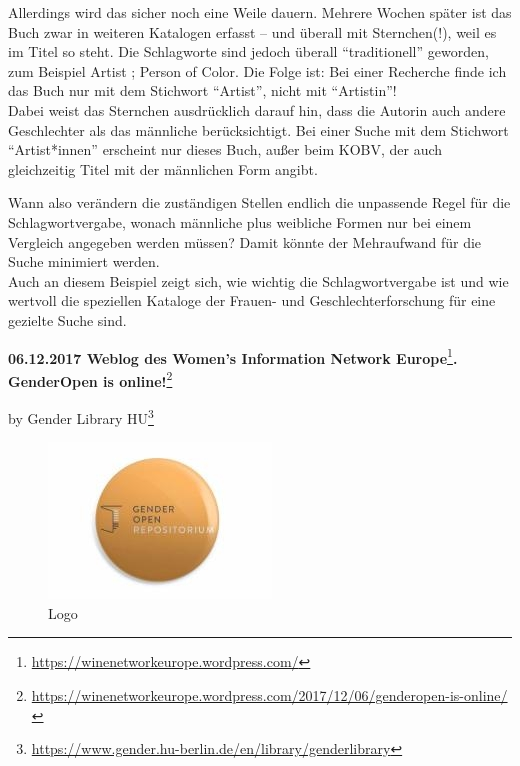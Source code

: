 \documentclass[a4paper,
fontsize=11pt,
oneside,
numbers=noperiodatend,
parskip=half-,
bibliography=totoc,
final
]{scrartcl}
\begin{document}
Allerdings wird das sicher noch eine Weile dauern. Mehrere Wochen später
ist das Buch zwar in weiteren Katalogen erfasst -- und überall mit
Sternchen(!), weil es im Titel so steht. Die Schlagworte sind jedoch
überall \enquote{traditionell} geworden, zum Beispiel Artist ; Person of
Color. Die Folge ist: Bei einer Recherche finde ich das Buch nur mit dem
Stichwort \enquote{Artist}, nicht mit \enquote{Artistin}!\\
Dabei weist das Sternchen ausdrücklich darauf hin, dass die Autorin auch
andere Geschlechter als das männliche berücksichtigt. Bei einer Suche
mit dem Stichwort \enquote{Artist*innen} erscheint nur dieses Buch,
außer beim KOBV, der auch gleichzeitig Titel mit der männlichen Form
angibt.

Wann also verändern die zuständigen Stellen endlich die unpassende Regel
für die Schlagwortvergabe, wonach männliche plus weibliche Formen nur
bei einem Vergleich angegeben werden müssen? Damit könnte der
Mehraufwand für die Suche minimiert werden.\\
Auch an diesem Beispiel zeigt sich, wie wichtig die Schlagwortvergabe
ist und wie wertvoll die speziellen Kataloge der Frauen- und
Geschlechterforschung für eine gezielte Suche sind.

\textbf{06.12.2017 Weblog des Women's Information Network
Europe}\footnote{\url{https://winenetworkeurope.wordpress.com/}}\textbf{.
GenderOpen is online!}\footnote{\url{https://winenetworkeurope.wordpress.com/2017/12/06/genderopen-is-online/}}

by Gender Library HU\footnote{\url{https://www.gender.hu-berlin.de/en/library/genderlibrary}}

\begin{figure}
\centering
\includegraphics{img/Aleksander_2.jpg}
\caption{Logo}
\end{figure}
\end{document}
